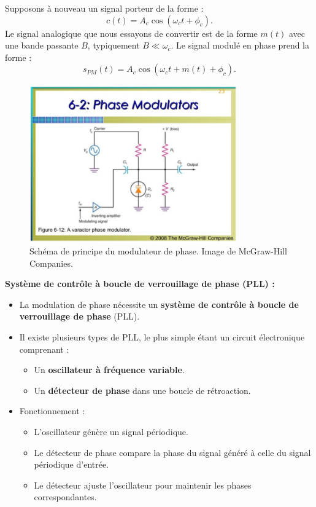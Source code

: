 Supposons à nouveau un signal porteur de la forme :  
\[
c(t) = A_c \cos(\omega_c t + \phi_c).
\]
Le signal analogique que nous essayons de convertir est de la forme $m(t)$ avec une bande passante $B$, typiquement $B \ll \omega_c$.  
Le signal modulé en phase prend la forme :
\[
s_{PM}(t) = A_c \cos(\omega_c t + m(t) + \phi_c).
\]
\begin{figure}[H] %
    \centering
    \includegraphics[width=0.8\textwidth]{figures/6-39.jpg}
    \caption{Schéma de principe du modulateur de phase. Image de McGraw-Hill Companies.}
    \label{fig:communication2}
\end{figure}
\textbf{Système de contrôle à boucle de verrouillage de phase (PLL) :}

\begin{itemize}
    \item La modulation de phase nécessite un \textbf{système de contrôle à boucle de verrouillage de phase} (PLL).
    \item Il existe plusieurs types de PLL, le plus simple étant un circuit électronique comprenant :
    \begin{itemize}
        \item Un \textbf{oscillateur à fréquence variable}.
        \item Un \textbf{détecteur de phase} dans une boucle de rétroaction.
    \end{itemize}
    \item Fonctionnement :
    \begin{itemize}
        \item L'oscillateur génère un signal périodique.
        \item Le détecteur de phase compare la phase du signal généré à celle du signal périodique d'entrée.
        \item Le détecteur ajuste l'oscillateur pour maintenir les phases correspondantes.
    \end{itemize}
\end{itemize}

